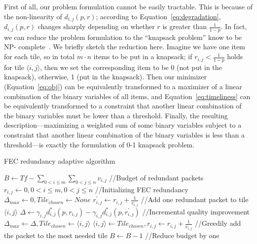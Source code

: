 First of all, our problem formulation cannot be
easily tractable. This is because of the non-linearity of 
$d_{i,j}(p,r)$; according to Equation~\ref{eq:degradation}, 
$d_{i,j}(p,r)$ changes sharply depending on whether $r$ is 
greater than $\frac{1}{1-p}$. In fact, we can reduce the problem 
formulation to the ``knapsack problem'' know to be NP-
complete~\cite{NP-complete}. We briefly sketch the 
reduction here. Imagine we have one item for each tile, so in 
total $m\cdot n$ items to be put in a knapsack; if 
$r_{i,j}<\frac{1}{1-p}$ holds for tile $\langle i,j\rangle$, then 
we set the corresponding item to be 0 (\ie not put in the 
knapsack), otherwise, 1 (\ie put in the knapsack). Then our 
minimizer (Equation~\ref{eq:obj}) can be equivalently transformed 
to a maximizer of a linear combination of the binary variables of 
all items, and Equation~\ref{eq:timeliness} can be equivalently 
transformed to a constraint that another linear combination of 
the binary variables must be lower than a threshold. Finally, the 
resulting description---maximizing a weighted sum of some binary 
variables subject to a constraint that another linear combination 
of the binary variables is less than a threshold---is exactly the 
formulation of 0-1 knapsack problem.


\begin{algorithm}[t] 
	\centering 
	\caption{FEC redundancy adaptive algorithm}
	\begin{algorithmic}[1]
	\STATE $B\leftarrow Tf-\sum_{0<i\leq m}\sum_{0<j\leq n}v_{i,j}$  \footnotesize{//Budget of redundant packets}
	\STATE $r_{i,j}\leftarrow 0, 0<i\leq m, 0<j\leq n$  \footnotesize{//Initializing FEC redundancy}
		\STATE $\Delta_{max}\leftarrow 0, Tile_{chosen}\leftarrow None$
				\STATE $r_{i,j}^{'}\leftarrow r_{i,j}+\frac{1}{v_{i,j}}$ \footnotesize{//Add one redundant packet to tile $\langle i,j\rangle$}
				\STATE $\Delta\leftarrow\gamma_{i,j}d_{i,j}^{*}(p,r_{i,j})-\gamma_{i,j}d_{i,j}^{*}(p,r_{i,j}^{'})$ \footnotesize{//Incremental quality improvement}
					\STATE $\Delta_{max}\leftarrow\Delta, Tile_{chosen}\leftarrow\langle i, j\rangle$
				\ENDIF
			\ENDFOR
		\ENDFOR
		\STATE $\langle i, j\rangle\leftarrow Tile_{chosen}, r_{i,j}\leftarrow r_{i,j}+\frac{1}{v_{i,j}}$ \footnotesize{//Greedily add the packet to the most needed tile}
		\STATE $B\leftarrow B-1$ \footnotesize{//Reduce budget by one}
	\ENDWHILE
	\end{algorithmic}  
	\label{alg:dante}
\end{algorithm} 

